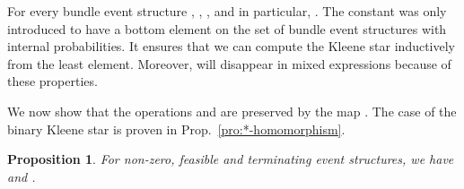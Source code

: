 \documentclass[review]{elsart}
\newtheorem{proposition}[definition]{Proposition}
\newcommand{\Prop}[1]{Prop.~\ref{#1}}
\begin{document}
For every bundle event structure , , , and in particular, . The constant  was only introduced to have a bottom element on the set of bundle event structures with internal probabilities. It ensures that we can compute the Kleene star inductively from the least element. Moreover,  will disappear in mixed expressions because of these properties.

We now show that the operations  and  are preserved by the map . The case of the binary Kleene star  is proven in \Prop{pro:*-homomorphism}.

\begin{proposition}\label{pro:homomorphism}
For  non-zero, feasible and terminating event structures, we have  and .
\end{proposition}
\end{document}
